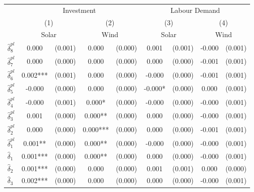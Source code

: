 {
\def\sym#1{\ifmmode^{#1}\else\(^{#1}\)\fi}
\begin{tabular}{l*{4}{cc}}
\toprule
            &\multicolumn{4}{c}{Investment}                           &\multicolumn{4}{c}{Labour Demand}                        \\\cmidrule(lr){2-5}\cmidrule(lr){6-9}
            &\multicolumn{2}{c}{(1)}     &\multicolumn{2}{c}{(2)}     &\multicolumn{2}{c}{(3)}     &\multicolumn{2}{c}{(4)}     \\
            &\multicolumn{2}{c}{Solar}   &\multicolumn{2}{c}{Wind}    &\multicolumn{2}{c}{Solar}   &\multicolumn{2}{c}{Wind}    \\
\midrule
$\hat{\delta}_8^{pl}$&       0.000   &     (0.001)&       0.000   &     (0.000)&       0.001   &     (0.001)&      -0.000   &     (0.001)\\
$\hat{\delta}_7^{pl}$&       0.000   &     (0.000)&       0.000   &     (0.000)&       0.000   &     (0.000)&      -0.001   &     (0.001)\\
$\hat{\delta}_6^{pl}$&       0.002***&     (0.001)&       0.000   &     (0.000)&      -0.000   &     (0.000)&      -0.001   &     (0.001)\\
$\hat{\delta}_5^{pl}$&      -0.000   &     (0.000)&       0.000   &     (0.000)&      -0.000*  &     (0.000)&       0.000   &     (0.001)\\
$\hat{\delta}_4^{pl}$&      -0.000   &     (0.001)&       0.000*  &     (0.000)&      -0.000   &     (0.000)&      -0.000   &     (0.001)\\
$\hat{\delta}_3^{pl}$&       0.001   &     (0.000)&       0.000** &     (0.000)&       0.000   &     (0.000)&      -0.000   &     (0.001)\\
$\hat{\delta}_2^{pl}$&       0.000   &     (0.000)&       0.000***&     (0.000)&       0.000   &     (0.000)&      -0.001   &     (0.001)\\
$\hat{\delta}_1^{pl}$&       0.001** &     (0.000)&       0.000** &     (0.000)&      -0.000   &     (0.000)&      -0.000   &     (0.001)\\
$\hat{\delta}_1$&       0.001***&     (0.000)&       0.000** &     (0.000)&       0.000   &     (0.000)&      -0.000   &     (0.001)\\
$\hat{\delta}_2$&       0.001***&     (0.000)&       0.000   &     (0.000)&       0.001   &     (0.001)&       0.000   &     (0.000)\\
$\hat{\delta}_3$&       0.002***&     (0.000)&       0.000   &     (0.000)&       0.000   &     (0.000)&      -0.000   &     (0.001)\\

\end{tabular}}
